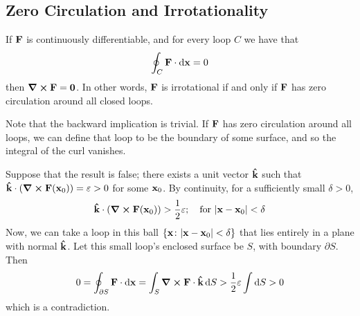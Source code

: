 \documentclass{article}
\begin{document}
\subsection{Zero Circulation and Irrotationality}
\begin{proposition}
    If $\vb F$ is continuously differentiable, and for every loop $C$ we have that
    \[ \oint_C \vb F \cdot \dd{\vb x} = 0 \]
    then $\curl{\vb F} = \vb 0$. In other words, $\vb F$ is irrotational if and only if $\vb F$ has zero circulation around all closed loops.
\end{proposition}
\noindent Note that the backward implication is trivial. If $\vb F$ has zero circulation around all loops, we can define that loop to be the boundary of some surface, and so the integral of the curl vanishes.
\begin{proposition}
    Suppose that the result is false; there exists a unit vector $\vu{k}$ such that $\vu{k} \cdot \left( \curl{\vb F(\vb x_0)} \right) = \varepsilon > 0$ for some $\vb x_0$. By continuity, for a sufficiently small $\delta > 0$,
    \[ \vu{k} \cdot \left( \curl{\vb F(\vb x_0)} \right) > \frac{1}{2}\varepsilon;\quad \text{for }\abs{\vb x - \vb x_0} < \delta \]
    Now, we can take a loop in this ball $\{ \vb x \colon \abs{\vb x - \vb x_0} < \delta \}$ that lies entirely in a plane with normal $\vu{k}$. Let this small loop's enclosed surface be $S$, with boundary $\partial S$. Then
    \[ 0 = \oint_{\partial S} \vb F \cdot \dd{\vb x} = \int_S \curl{\vb F} \cdot \vu k \dd{S} > \frac{1}{2}\varepsilon \int \dd{S} > 0 \]
    which is a contradiction.
\end{proposition}
\end{document}
